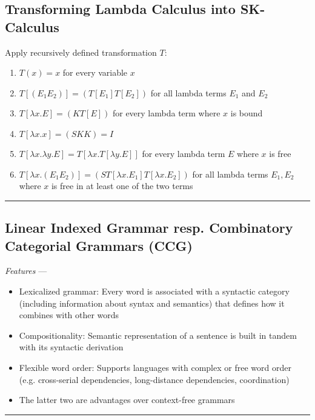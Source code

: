 \subsection*{Transforming Lambda Calculus into SK-Calculus}
Apply recursively defined transformation $T$:
\begin{enumerate}
    \item $T(x) = x$ for every variable $x$
    \item $T[(E_1E_2)] = (T[E_1]T[E_2])$ for all lambda terms $E_1$ and $E_2$
    \item $T[\lambda x.E] = (KT[E])$ for every lambda term where $x$ is bound
    \item $T[\lambda x.x] =  (SKK) = I$
    \item $T[\lambda x.\lambda y.E] = T[\lambda x.T[\lambda y.E]]$ for every lambda term $E$ where $x$ is free
    \item $T[\lambda x.(E_1E_2)] = (ST[\lambda x.E_1]T[\lambda x.E_2])$ for all lambda terms $E_1, E_2$ where $x$ is free in at least one of the two terms
\end{enumerate}

{\color{black}\hrule height 0.001mm}

\subsection*{Linear Indexed Grammar resp. Combinatory Categorial Grammars (CCG)}
\emph{Features} --- 
\begin{itemize}
    \item Lexicalized grammar: Every word is associated with a syntactic category (including information about syntax and semantics) that defines how it combines with other words
    \item Compositionality: Semantic representation of a sentence is built in tandem with its syntactic derivation
    \item Flexible word order: Supports languages with complex or free word order (e.g. cross-serial dependencies, long-distance dependencies, coordination)
    \item The latter two are advantages over context-free grammars
\end{itemize}

{\color{lightgray}\hrule height 0.001mm}

